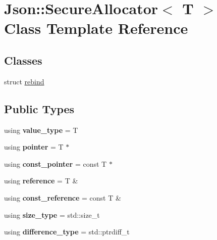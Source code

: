 \hypertarget{classJson_1_1SecureAllocator}{}\section{Json\+:\+:Secure\+Allocator$<$ T $>$ Class Template Reference}
\label{classJson_1_1SecureAllocator}
\subsection*{Classes}
\begin{DoxyCompactItemize}
\item 
struct \hyperlink{structJson_1_1SecureAllocator_1_1rebind}{rebind}
\end{DoxyCompactItemize}
\subsection*{Public Types}
\begin{DoxyCompactItemize}
\item 
using {\bfseries value\+\_\+type} = T\hypertarget{classJson_1_1SecureAllocator_ae45a020fc6d6f3ae66394c81c4281ad8}{}\label{classJson_1_1SecureAllocator_ae45a020fc6d6f3ae66394c81c4281ad8}

\item 
using {\bfseries pointer} = T $\ast$\hypertarget{classJson_1_1SecureAllocator_a442c09b3267622d23416d9072ea1afe9}{}\label{classJson_1_1SecureAllocator_a442c09b3267622d23416d9072ea1afe9}

\item 
using {\bfseries const\+\_\+pointer} = const T $\ast$\hypertarget{classJson_1_1SecureAllocator_a464b356817c78ea996cd3a7403f7e735}{}\label{classJson_1_1SecureAllocator_a464b356817c78ea996cd3a7403f7e735}

\item 
using {\bfseries reference} = T \&\hypertarget{classJson_1_1SecureAllocator_a55b243c56812b3852b59c1a9b0a21c65}{}\label{classJson_1_1SecureAllocator_a55b243c56812b3852b59c1a9b0a21c65}

\item 
using {\bfseries const\+\_\+reference} = const T \&\hypertarget{classJson_1_1SecureAllocator_a3f0327d609dcd1942c8c7fa4d4f227e5}{}\label{classJson_1_1SecureAllocator_a3f0327d609dcd1942c8c7fa4d4f227e5}

\item 
using {\bfseries size\+\_\+type} = std\+::size\+\_\+t\hypertarget{classJson_1_1SecureAllocator_a61c258f0ae80af6982fae200b55a4dc9}{}\label{classJson_1_1SecureAllocator_a61c258f0ae80af6982fae200b55a4dc9}

\item 
using {\bfseries difference\+\_\+type} = std\+::ptrdiff\+\_\+t\hypertarget{classJson_1_1SecureAllocator_a404f41a8e340a8af1b54138920a6ef33}{}\label{classJson_1_1SecureAllocator_a404f41a8e340a8af1b54138920a6ef33}

\end{DoxyCompactItemize}
